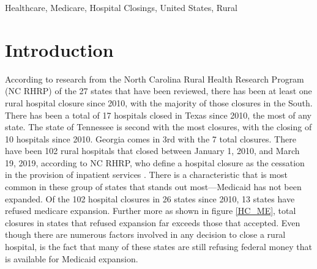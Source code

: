 \documentclass[10pt,conference]{IEEEtran}
\begin{document}
\begin{IEEEkeywords}
Healthcare, Medicare, Hospital Closings, United States, Rural
\end{IEEEkeywords}

\section{Introduction}
According to research from the North Carolina Rural Health Research Program (NC RHRP) of the 27 states that have been reviewed, there has been at least one rural hospital closure since 2010, with the majority of those closures in the South. There has been a total of 17 hospitals closed in Texas since 2010, the most of any state. The state of Tennessee is second with the most closures, with the closing of 10 hospitals since 2010. Georgia comes in 3rd with the 7 total closures. There have been 102 rural hospitals that closed between January 1, 2010, and March 19, 2019, according to NC RHRP, who define a hospital closure as the cessation in the provision of inpatient services \cite{ellison}. There is a characteristic that is most common in these group of states that stands out most---Medicaid has not been expanded. Of the 102 hospital closures in 26 states since 2010, 13 states have refused medicare expansion. Further more as shown in figure \ref{HC_ME}, total closures in states that refused expansion far exceeds those that accepted. Even though there are numerous factors involved in any decision to close a rural hospital, is the fact that many of these states are still refusing federal money that is available for Medicaid expansion. 
\end{document}
